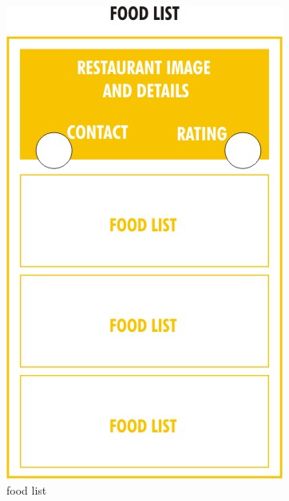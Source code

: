 \documentclass[12pt]{article}
\begin{document}
\begin{figure}
\centering
\includegraphics[scale=0.4]{milestone2/7.jpeg}
\caption{food list}
\end{figure}







































\end{document}

